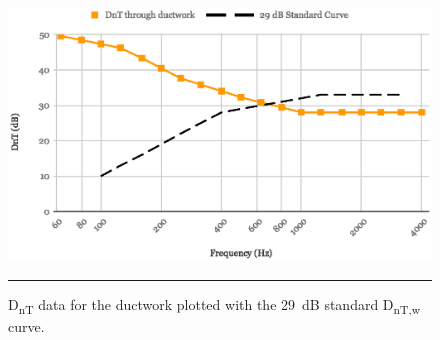 \begin{figure}[htbp]
	\centering
	\includegraphics[width=\textwidth]{figures/DnTw_D.eps}
	\rule{\textwidth}{0.5pt} %
	\caption{D\textsubscript{nT} data for the ductwork plotted with the 29~dB standard D\textsubscript{nT,w} curve.}
	\label{fig:DnTw_ductwork}
\end{figure}